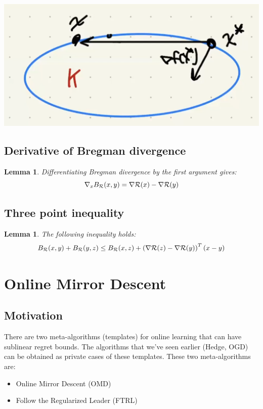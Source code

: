 \documentclass[11pt]{article}
\newtheorem{lemma}[theorem]{Lemma}
\theoremstyle{definition}
\theoremstyle{definition}
\newcommand{\pth}[1]{\left( #1\right)}                 %
\begin{document}
\includegraphics[scale=0.5]{convex_optimality}


\subsection{Derivative of Bregman divergence}

\begin{lemma}
Differentiating Bregman divergence by the first argument gives:
\begin{equation*}
\nabla_x B_{\mathcal R} (x,y) = \nabla \mathcal R(x) - \nabla \mathcal R(y)
\end{equation*}

\end{lemma}

\subsection{Three point inequality}

\begin{lemma}
The following inequality holds:
\begin{equation*}
B_\R (x,y) + B_\R (y,z) \leq B_\R (x,z) + \pth{\nabla \R(z) - \nabla \R(y)}^T \pth{x-y}
\end{equation*}

\end{lemma}


\section{Online Mirror Descent}

\subsection{Motivation}

There are two meta-algorithms (templates) for online learning that can have sublinear regret bounds. The algorithms that we've seen earlier (Hedge, OGD) can be obtained as private cases of these templates. These two meta-algorithms are:
\begin{itemize}
\item Online Mirror Descent (OMD)
\item Follow the Regularized Leader (FTRL)
\end{itemize}
\end{document}
